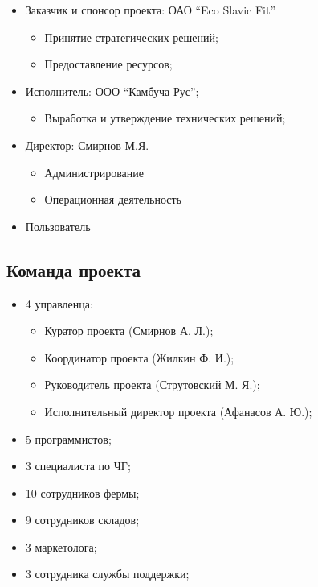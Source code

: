 \documentclass[a4paper,10pt]{article}
\begin{document}
    \begin{itemize}
        \item Заказчик и спонсор проекта: ОАО ``Eco Slavic Fit''
            \begin{itemize}
                \item Принятие стратегических решений;
                \item Предоставление ресурсов;
            \end{itemize}
        \item Исполнитель: ООО ``Камбуча-Рус'';
            \begin{itemize}
                \item Выработка и утверждение технических решений;
            \end{itemize}
        \item Директор: Смирнов М.Я.
            \begin{itemize}
                \item Администрирование
                \item Операционная деятельность
            \end{itemize}
        \item Пользователь
    \end{itemize}

\subsection{Команда проекта}

    \begin{itemize}
        \item 4 управленца:
            \begin{itemize}
                \item Куратор проекта (Смирнов А. Л.);
                \item Координатор проекта (Жилкин Ф. И.);
                \item Руководитель проекта (Струтовский М. Я.);
                \item Исполнительный директор проекта (Афанасов А. Ю.);
            \end{itemize}
        \item 5 программистов;
        \item 3 специалиста по ЧГ;
        \item 10 сотрудников фермы;
        \item 9 сотрудников складов;
        \item 3 маркетолога;
        \item 3 сотрудника службы поддержки;
    \end{itemize}
\end{document}
